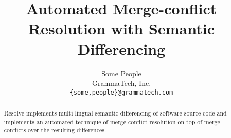 \documentclass[letterpaper,twocolumn,10pt]{article}
\begin{document}
\title{Automated Merge-conflict Resolution with Semantic Differencing}

\author{
  {\rm Some People}\\
  GrammaTech, Inc.\\
  {\tt \{some,people\}@grammatech.com}
}

\maketitle

\begin{abstract}
Resolve implements multi-lingual semantic differencing of software
source code and implements an automated technique of merge conflict
resolution on top of merge conflicts over the resulting differences.
\end{abstract}










\end{document}
